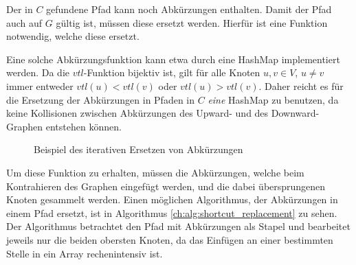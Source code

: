 Der in $C$ gefundene Pfad kann noch Abkürzungen enthalten.
Damit der Pfad auch auf $G$ gültig ist, müssen diese ersetzt werden.
Hierfür ist eine Funktion notwendig, welche diese ersetzt.

Eine solche Abkürzungsfunktion kann etwa durch eine HashMap implementiert werden.
Da die ${vtl}$-Funktion bijektiv ist, gilt für alle Knoten $u, v \in V$, $u \neq v$ immer entweder ${vtl}(u) < {vtl}(v)$ oder ${vtl}(u) > {vtl}(v)$.
Daher reicht es für die Ersetzung der Abkürzungen in Pfaden in $C$ \emph{eine} HashMap zu benutzen, da keine Kollisionen zwischen Abkürzungen des Upward- und des Downward-Graphen entstehen können.

\begin{figure}[ht]
  \centering
  \caption{Beispiel des iterativen Ersetzen von Abkürzungen}
\end{figure}

Um diese Funktion zu erhalten, müssen die Abkürzungen, welche beim Kontrahieren des Graphen eingefügt werden, und die dabei übersprungenen Knoten gesammelt werden.
Einen möglichen Algorithmus, der Abkürzungen in einem Pfad ersetzt, ist in Algorithmus \ref{ch:alg:shortcut_replacement} zu sehen.
Der Algorithmus betrachtet den Pfad mit Abkürzungen als Stapel und bearbeitet jeweils nur die beiden obersten Knoten, da das Einfügen an einer bestimmten Stelle in ein Array rechenintensiv ist.

